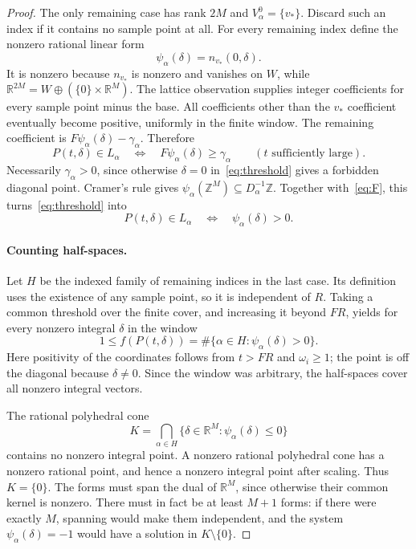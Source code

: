 \documentclass[a4paper,USenglish,cleveref,autoref]{lipics-v2021}
\newcommand{\Z}{\mathbb Z}
\newcommand{\R}{\mathbb R}
\begin{document}
\begin{proof}
The only remaining case has rank $2M$ and $V_\alpha^0=\{v_*\}$.
Discard such an index if it contains no sample point at all.
For every remaining index define the nonzero rational linear form
\begin{equation}\label{eq:psi}
 \psi_\alpha(\delta)=n_{v_*}(0,\delta).
\end{equation}
It is nonzero because $n_{v_*}$ is nonzero and vanishes on $W$, while $\R^{2M}=W\oplus(\{0\}\times\R^M)$.
The lattice observation supplies integer coefficients for every sample point minus the base.
All coefficients other than the $v_*$ coefficient eventually become positive, uniformly in the finite window.
The remaining coefficient is $F\psi_\alpha(\delta)-\gamma_\alpha$.
Therefore
\begin{equation}\label{eq:threshold}
 P(t,\delta)\in L_\alpha
 \quad\Longleftrightarrow\quad
 F\psi_\alpha(\delta)\geq\gamma_\alpha
 \qquad(t\text{ sufficiently large}).
\end{equation}
Necessarily $\gamma_\alpha>0$, since otherwise $\delta=0$ in~\eqref{eq:threshold} gives a forbidden diagonal point.
Cramer's rule gives $\psi_\alpha(\Z^M)\subseteq D_\alpha^{-1}\Z$.
Together with~\eqref{eq:F}, this turns~\eqref{eq:threshold} into
\begin{equation}\label{eq:halfspace}
 P(t,\delta)\in L_\alpha
 \quad\Longleftrightarrow\quad \psi_\alpha(\delta)>0.
\end{equation}

\paragraph{Counting half-spaces.}
Let $H$ be the indexed family of remaining indices in the last case.
Its definition uses the existence of any sample point, so it is independent of $R$.
Taking a common threshold over the finite cover, and increasing it beyond $FR$, yields for every nonzero integral $\delta$ in the window
\begin{equation}\label{eq:eventual}
 1\leq f(P(t,\delta))
 =\#\{\alpha\in H:\psi_\alpha(\delta)>0\}.
\end{equation}
Here positivity of the coordinates follows from $t>FR$ and $\omega_i\geq1$; the point is off the diagonal because $\delta\ne0$.
Since the window was arbitrary, the half-spaces cover all nonzero integral vectors.

The rational polyhedral cone
\[
 K=\bigcap_{\alpha\in H}\{\delta\in\R^M:\psi_\alpha(\delta)\leq0\}
\]
contains no nonzero integral point.
A nonzero rational polyhedral cone has a nonzero rational point, and hence a nonzero integral point after scaling.
Thus $K=\{0\}$.
The forms must span the dual of $\R^M$, since otherwise their common kernel is nonzero.
There must in fact be at least $M+1$ forms: if there were exactly $M$, spanning would make them independent, and the system $\psi_\alpha(\delta)=-1$ would have a solution in $K\setminus\{0\}$.


\end{proof}
\end{document}
